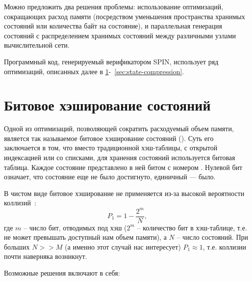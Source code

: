 Можно предложить два решения проблемы: использование оптимизаций,
сокращающих расход памяти (посредством уменьшения пространства
хранимых состояний или количества байт на состояние), и параллельная
генерация состояний с распределением хранимых состояний между
различными узлами вычислительной сети.

Программный код, генерируемый верификатором SPIN, использует ряд
оптимизаций, описанных далее в \ref{sec:bit-hashing}-~\ref{sec:state-compression}.

\section{Битовое хэширование состояний}
\label{sec:bit-hashing}

Одной из оптимизаций, позволяющей сократить расходуемый объем памяти,
является так называемое битовое хэширование состояний (). Суть его заключается в том, что вместо традиционной
хэш-таблицы, с открытой индексацией или со списками, для хранения
состояний используется битовая таблица. Каждое состояние 
представлено в ней битом с номером . Нулевой бит
означает, что состояние еще не было достигнуто, единичный — было. 

В чистом виде битовое хэширование не применяется из-за высокой
вероятности коллизий~\cite{BitHash1}:
\begin{equation}
  \label{eq:bithash-single-coll}
  P_1 = 1 - \frac{2^m}{N},
\end{equation}
где $m$ -- число бит, отводимых под хэш ($2^m$ -- количество бит в
хэш-таблице, т.е. не может превышать доступный нам объем памяти), а
$N$ -- число состояний. При больших $N >> M$ (а именно этот случай нас
интересует) $P_1 \approx 1$, т.е. коллизии почти наверняка возникнут.

Возможные решения включают в себя:

